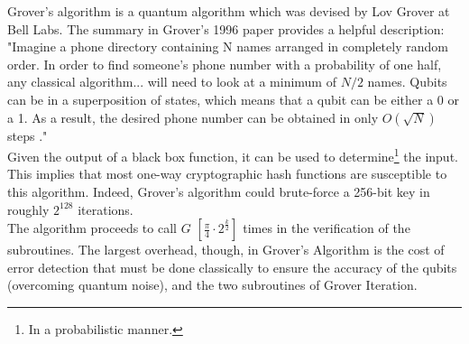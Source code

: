 \documentclass[11pt]{article}
\begin{document}
Grover's algorithm is a quantum algorithm which was devised by Lov Grover at Bell Labs.
The summary in Grover's 1996 paper provides a helpful description:
"Imagine a phone directory containing N names arranged in completely random order. 
In order to find someone's phone number with a probability of one half, 
any classical algorithm... will need to look at a minimum of $N/2$ names. 
Qubits can be in a superposition of states, which means that a qubit can be either a 0 or a 1.
As a result, the desired phone number can be obtained in only $O(\sqrt{N})$ steps \cite{lovgrover}."\\ 

\noindent Given the output of a black box function, it can be used to determine\footnote{In a probabilistic manner.} the input.
This implies that most one-way cryptographic hash functions are susceptible to this algorithm.
Indeed, Grover's algorithm could brute-force a 256-bit key in roughly $2^{128}$ iterations.\\ 

\noindent The algorithm proceeds to call $G$ $[\frac{\pi}{4} \cdot 2^{\frac{k}{2}}]$ times in the verification of the subroutines. The largest overhead, though, in Grover's Algorithm is the cost of error detection that must be done classically to ensure the accuracy of the qubits (overcoming quantum noise), and the two subroutines of Grover Iteration.\\
\end{document}
